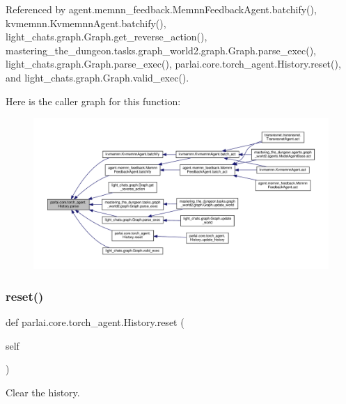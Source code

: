 Referenced by agent.\+memnn\+\_\+feedback.\+Memnn\+Feedback\+Agent.\+batchify(), kvmemnn.\+Kvmemnn\+Agent.\+batchify(), light\+\_\+chats.\+graph.\+Graph.\+get\+\_\+reverse\+\_\+action(), mastering\+\_\+the\+\_\+dungeon.\+tasks.\+graph\+\_\+world2.\+graph.\+Graph.\+parse\+\_\+exec(), light\+\_\+chats.\+graph.\+Graph.\+parse\+\_\+exec(), parlai.\+core.\+torch\+\_\+agent.\+History.\+reset(), and light\+\_\+chats.\+graph.\+Graph.\+valid\+\_\+exec().

Here is the caller graph for this function\+:
\nopagebreak
\begin{figure}[H]
\begin{center}
\leavevmode
\includegraphics[width=350pt]{classparlai_1_1core_1_1torch__agent_1_1History_a7758c7e9d42442ac228b820be4298d84_icgraph}
\end{center}
\end{figure}
\mbox{\label{classparlai_1_1core_1_1torch__agent_1_1History_a82e02d0b34707b2e00b95bc659411bae}} 
\subsubsection{\texorpdfstring{reset()}{reset()}}
{\footnotesize\ttfamily def parlai.\+core.\+torch\+\_\+agent.\+History.\+reset (\begin{DoxyParamCaption}\item[{}]{self }\end{DoxyParamCaption})}

\begin{DoxyVerb}Clear the history.\end{DoxyVerb}
 

